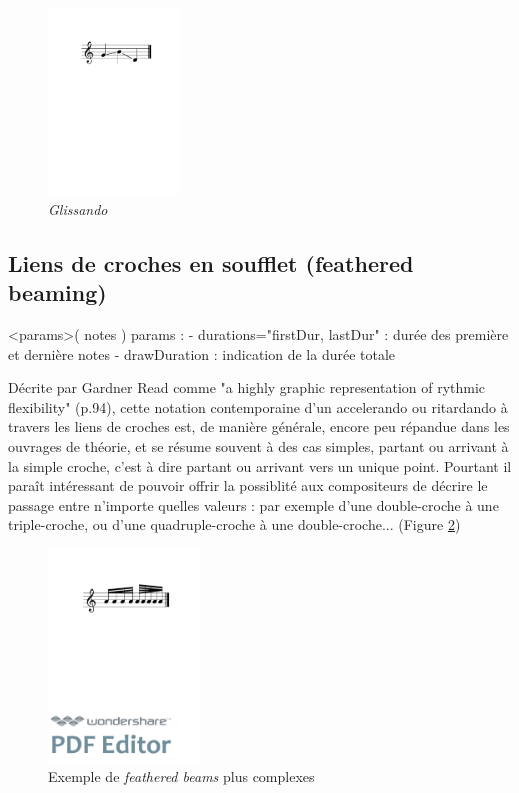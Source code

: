 \documentclass{article}
\newenvironment{gmncode}	{\vspace{-2mm}\small\verbatim}{\endverbatim\vspace{-2mm}}
\begin{document}
\begin{figure}[h]
\centering

\begin{gmncode}
  [ \glissando( g b d ) ]
\end{gmncode}

\includegraphics[width=35mm]{img/glissando1.pdf}
\caption{\emph{Glissando}}
\label{fig:glissandoSimple}
\end{figure}




\subsection{Liens de croches en soufflet (feathered beaming)}\label{subsec:featheredBeaming}
\bigskip

\begin{gmncode}
  \fBeam<params>( notes )
   params : 
    - durations="firstDur, lastDur" : 
      durée des première et dernière notes
    - drawDuration : 
      indication de la durée totale

\end{gmncode}

Décrite par Gardner Read comme "a highly graphic representation of rythmic flexibility"  \cite{read1969music} (p.94), cette notation contemporaine d'un accelerando ou ritardando à travers les liens de croches est, de manière générale, encore peu répandue dans les ouvrages de théorie, et se résume souvent à des cas simples, partant ou arrivant à la simple croche, c'est à dire partant ou arrivant vers un unique point. Pourtant il paraît intéressant de pouvoir offrir la possiblité aux compositeurs de décrire le passage entre n'importe quelles valeurs : par exemple d'une double-croche à une triple-croche, ou d'une quadruple-croche à une double-croche... (Figure \ref{fig:fbeamcomplex})

\begin{figure}[h]
\centering
\includegraphics[width=40mm]{img/fbeamcomplex.pdf}
\caption{Exemple de \emph{feathered beams} plus complexes}
\label{fig:fbeamcomplex}
\end{figure}
\end{document}
